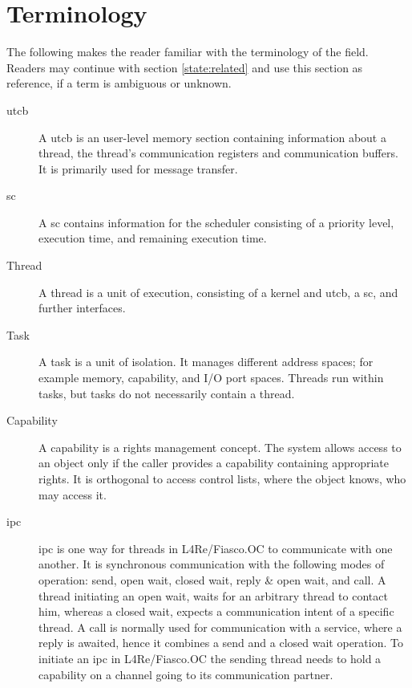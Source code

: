 \section{Terminology}
\label{state:term}

The following makes the reader familiar with the terminology of the field.
Readers may continue with section \ref{state:related} and use this section
as reference, if a term is ambiguous or unknown.


\begin{description}
  \item[\Gls{utcb}] A \gls{utcb} is an user-level memory section containing
    information about a thread, the thread's communication registers and
    communication buffers. It is primarily used for message transfer.

  \item[\Gls{sc}] A \gls{sc} contains information for the scheduler consisting
    of a priority level, execution time, and remaining execution time.

  \item[Thread] A thread is a unit of execution, consisting of a kernel and
    \gls{utcb}, a \gls{sc}, and further interfaces.

  \item[Task] A task is a unit of isolation. It manages different address
    spaces; for example memory, capability, and I/O port spaces.
    Threads run within tasks, but tasks do not necessarily contain a thread.

  \item[Capability] A capability is a rights management concept.
    The system allows access to an object only if the caller provides a
    capability containing appropriate rights.
    It is orthogonal to access control lists, where the object knows, who may
    access it.

  \item[\Gls{ipc}] \Gls{ipc} is one way for threads in L4Re/Fiasco.OC
    to communicate with one another.
    It is synchronous communication with the following modes of operation:
    send, open wait, closed wait, reply \& open wait, and call.
    A thread initiating an open wait, waits for an arbitrary thread to contact
    him, whereas a closed wait, expects a communication intent of a specific
    thread.
    A call is normally used for communication with a service, where a reply is
    awaited, hence it combines a send and a closed wait operation.
    To initiate an \gls{ipc} in L4Re/Fiasco.OC the sending thread needs to hold
    a capability on a channel going to its communication partner.


\end{description}
